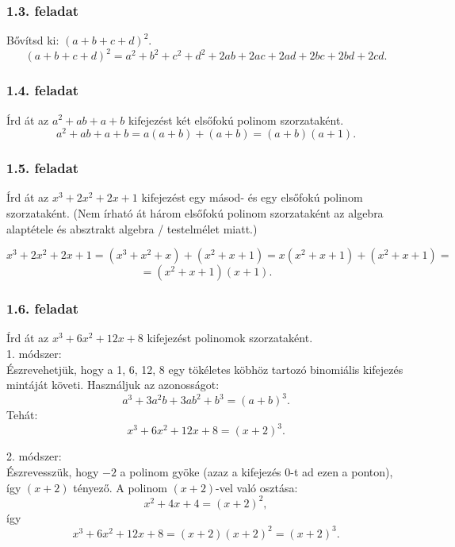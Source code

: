 \documentclass{article}
\begin{document}
\subsubsection{1.3. feladat}
Bővítsd ki: $(a+b+c+d)^2$.
\begin{equation}
    (a+b+c+d)^2 = a^2 + b^2 + c^2 + d^2 + 2ab + 2ac + 2ad + 2bc + 2bd + 2cd.
\end{equation}

\subsubsection{1.4. feladat}
Írd át az $a^2 + ab + a + b$ kifejezést két elsőfokú polinom szorzataként.
\begin{equation}
    a^2 + ab + a + b = a(a+b) + (a+b) = (a + b)(a + 1).
\end{equation}

\subsubsection{1.5. feladat}
Írd át az $x^3 + 2x^2 + 2x + 1$ kifejezést egy másod- és egy elsőfokú polinom szorzataként. (Nem írható át három elsőfokú polinom szorzataként az algebra alaptétele és absztrakt algebra / testelmélet miatt.)

\begin{equation}
    x^3 + 2x^2 + 2x + 1 = (x^3 + x^2 + x) + (x^2 + x + 1) = x(x^2 + x + 1) + (x^2 + x + 1) =
\end{equation}
\begin{equation}
    = (x^2 + x + 1)(x + 1).
\end{equation}

\subsubsection{1.6. feladat}
Írd át az $x^3 + 6x^2 + 12x + 8$ kifejezést polinomok szorzataként.\\
1. módszer:\\
Észrevehetjük, hogy a 1, 6, 12, 8 egy tökéletes köbhöz tartozó binomiális kifejezés mintáját követi. Használjuk az azonosságot:
\begin{equation}
    a^3 + 3a^2b+3ab^2+b^3 = (a+b)^3.
\end{equation}
Tehát:
\begin{equation}
    x^3 + 6x^2 + 12x + 8 = (x+2)^3.
\end{equation}

2. módszer:\\
Észrevesszük, hogy $-2$ a polinom gyöke (azaz a kifejezés $0$-t ad ezen a ponton), így $(x+2)$ tényező. A polinom $(x+2)$-vel való osztása:
\begin{equation}
    x^2 + 4x + 4 = (x+2)^2,
\end{equation}
így
\begin{equation}
    x^3 + 6x^2 + 12x + 8 = (x+2)(x+2)^2 = (x+2)^3.
\end{equation}
\end{document}
